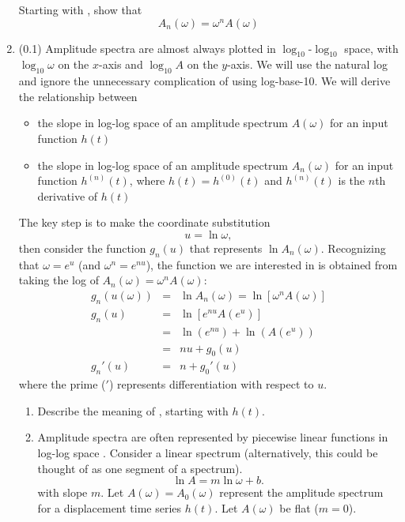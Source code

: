 \documentclass[11pt,titlepage,fleqn]{article}
\newcommand{\fft}{h}
\begin{document}
\begin{enumerate}
Starting with , show that
%
\begin{equation}
A_n(\omega) = \omega^n A(\omega)
\end{equation}


\item (0.1) Amplitude spectra are almost always plotted in $\log_{10}$-$\log_{10}$ space, with $\log_{10}\omega$ on the $x$-axis and $\log_{10}A$ on the $y$-axis. We will use the natural log and ignore the unnecessary complication of using log-base-10. We will derive the relationship between
%
\begin{itemize}
\item the slope in log-log space of an amplitude spectrum $A(\omega)$ for an input function $\fft(t)$
\item the slope in log-log space of an amplitude spectrum $A_n(\omega)$ for an input function $h^{(n)}(t)$, where $h(t) = h^{(0)}(t)$ and $h^{(n)}(t)$ is the $n$th derivative of $h(t)$
\end{itemize}

The key step is to make the coordinate substitution
%
\begin{equation}
u = \ln\omega,
\end{equation}
%
then consider the function $g_n(u)$ that represents $\ln A_n(\omega)$. Recognizing that $\omega = e^u$ (and $\omega^n = e^{nu}$), the function we are interested in is obtained from taking the log of \mbox{$A_n(\omega) = \omega^n A(\omega)$}:
%
\begin{eqnarray}
g_n(u(\omega)) &=& \ln A_n(\omega) = \ln[ \omega^n A(\omega)]
\\
g_n(u) &=& \ln[ e^{nu} A(e^u) ]
\\
&=& \ln(e^{nu}) + \ln(A(e^u))
\\
&=& nu + g_0(u)
\\
g_n'(u) &=& n + g_0'(u)
\label{Anslope}
\end{eqnarray}
%
where the prime ($'$) represents differentiation with respect to $u$.

\begin{enumerate}
\item Describe the meaning of , starting with $\fft(t)$.

\item Amplitude spectra are often represented by piecewise linear functions in log-log space \citep[\eg][Figs.~6.3-6 and 6.6-8]{SteinWysession}. Consider a linear spectrum (alternatively, this could be thought of as one segment of a spectrum).
%
\begin{equation}
\ln A = m \ln\omega + b.
\label{Alin}
\end{equation}
%
with slope $m$.
Let $A(\omega) = A_0(\omega)$ represent the amplitude spectrum for a displacement time series $\fft(t)$. Let $A(\omega)$ be flat ($m=0$).


\end{enumerate}
\end{enumerate}
\end{document}

